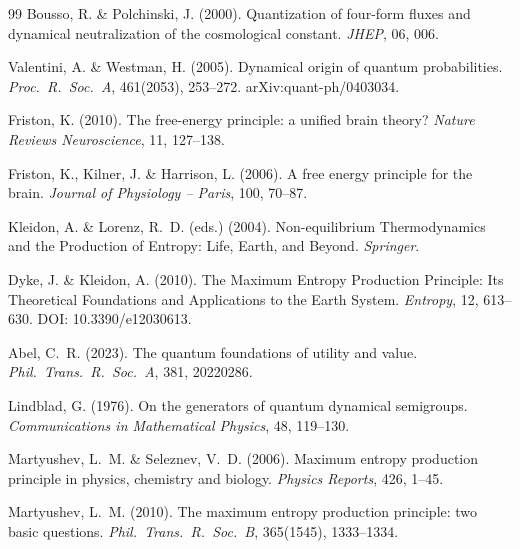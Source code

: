 \documentclass[12pt,a4paper]{article}
\theoremstyle{remark}
\begin{document}
{\begin{thebibliography}{99}
Bousso, R. \& Polchinski, J. (2000).
\newblock Quantization of four-form fluxes and dynamical neutralization of the cosmological constant.
\newblock \textit{JHEP}, 06, 006.

Valentini, A. \& Westman, H. (2005).
\newblock Dynamical origin of quantum probabilities.
\newblock \textit{Proc.\ R.\ Soc.\ A}, 461(2053), 253--272. arXiv:quant-ph/0403034.

Friston, K. (2010).
\newblock The free-energy principle: a unified brain theory?
\newblock \textit{Nature Reviews Neuroscience}, 11, 127--138.

Friston, K., Kilner, J. \& Harrison, L. (2006).
\newblock A free energy principle for the brain.
\newblock \textit{Journal of Physiology -- Paris}, 100, 70--87.

Kleidon, A. \& Lorenz, R.~D. (eds.) (2004).
\newblock Non-equilibrium Thermodynamics and the Production of Entropy: Life, Earth, and Beyond.
\newblock \textit{Springer}.

Dyke, J. \& Kleidon, A. (2010).
\newblock The Maximum Entropy Production Principle: Its Theoretical Foundations and Applications to the Earth System.
\newblock \textit{Entropy}, 12, 613--630.
\newblock DOI: 10.3390/e12030613.

Abel, C.~R. (2023).
\newblock The quantum foundations of utility and value.
\newblock \textit{Phil.\ Trans.\ R.\ Soc.\ A}, 381, 20220286.


Lindblad, G. (1976).
\newblock On the generators of quantum dynamical semigroups.
\newblock \textit{Communications in Mathematical Physics}, 48, 119--130.

Martyushev, L.~M. \& Seleznev, V.~D. (2006).
\newblock Maximum entropy production principle in physics, chemistry and biology.
\newblock \textit{Physics Reports}, 426, 1--45.

Martyushev, L.~M. (2010).
\newblock The maximum entropy production principle: two basic questions.
\newblock \textit{Phil.\ Trans.\ R.\ Soc.\ B}, 365(1545), 1333--1334.


\end{thebibliography}}
\end{document}
